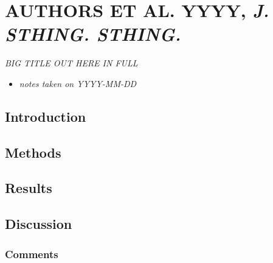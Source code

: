 \documentclass[
]{book}
\providecommand{\tightlist}{%
  \setlength{\itemsep}{0pt}\setlength{\parskip}{0pt}}
\begin{document}
\hypertarget{authors-et-al.-yyyy-j.-sthing.-sthing.}{%
\chapter{\texorpdfstring{AUTHORS ET AL. YYYY, \emph{J. STHING. STHING.}}{AUTHORS ET AL. YYYY, J. STHING. STHING.}}\label{authors-et-al.-yyyy-j.-sthing.-sthing.}}


\emph{BIG TITLE OUT HERE IN FULL} \citep{schuchmannsiemers2010a}

\begin{itemize}
\tightlist
\item
  \emph{notes taken on YYYY-MM-DD}
\end{itemize}

\hypertarget{introduction}{%
\section{Introduction}\label{introduction}}

\hypertarget{methods}{%
\section{Methods}\label{methods}}

\hypertarget{results}{%
\section{Results}\label{results}}

\hypertarget{discussion}{%
\section{Discussion}\label{discussion}}

\hypertarget{comments}{%
\subsection{Comments}\label{comments}}

  
\end{document}
